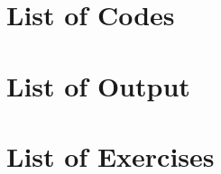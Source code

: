 \begin{htmlonly}

\listoffigures

 \part*{List of Codes}


 \part*{List of Output}


 \part*{List of Exercises}



\end{htmlonly}
